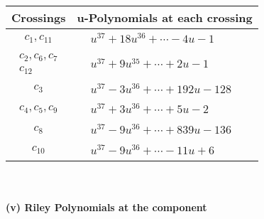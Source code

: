 \documentclass[1p]{elsarticle_modified}
\theoremstyle{definition}
\begin{document}
\begin{tabular}{m{50pt}|m{274pt}}
Crossings & \hspace{64pt}u-Polynomials at each crossing \\
\hline $$\begin{aligned}c_{1},c_{11}\end{aligned}$$&$\begin{aligned}
&u^{37}+18 u^{36}+\cdots-4 u-1
\end{aligned}$\\
\hline $$\begin{aligned}c_{2},c_{6},c_{7}\\c_{12}\end{aligned}$$&$\begin{aligned}
&u^{37}+9 u^{35}+\cdots+2 u-1
\end{aligned}$\\
\hline $$\begin{aligned}c_{3}\end{aligned}$$&$\begin{aligned}
&u^{37}-3 u^{36}+\cdots+192 u-128
\end{aligned}$\\
\hline $$\begin{aligned}c_{4},c_{5},c_{9}\end{aligned}$$&$\begin{aligned}
&u^{37}+3 u^{36}+\cdots+5 u-2
\end{aligned}$\\
\hline $$\begin{aligned}c_{8}\end{aligned}$$&$\begin{aligned}
&u^{37}-9 u^{36}+\cdots+839 u-136
\end{aligned}$\\
\hline $$\begin{aligned}c_{10}\end{aligned}$$&$\begin{aligned}
&u^{37}-9 u^{36}+\cdots-11 u+6
\end{aligned}$\\
\hline
\end{tabular}\\~\\
\newpage\renewcommand{\arraystretch}{1}
\flushleft \textbf{(v) Riley Polynomials at the component}\newline \\
\end{document}
